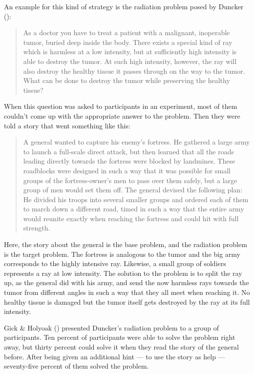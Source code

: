 \documentclass[
]{krantz}
\begin{document}
An example for this kind of strategy is the radiation problem posed by Duncker ():

\begin{quote}
As a doctor you have to treat a patient with a malignant, inoperable tumor, buried deep inside the body. There exists a special kind of ray which is harmless at a low intensity, but at sufficiently high intensity is able to destroy the tumor. At such high intensity, however, the ray will also destroy the healthy tissue it passes through on the way to the tumor. What can be done to destroy the tumor while preserving the healthy tissue?
\end{quote}

When this question was asked to participants in an experiment, most of them couldn't come up with the appropriate answer to the problem. Then they were told a story that went something like this:

\begin{quote}
A general wanted to capture his enemy's fortress. He gathered a large army to launch a full-scale direct attack, but then learned that all the roads leading directly towards the fortress were blocked by landmines. These roadblocks were designed in such a way that it was possible for small groups of the fortress-owner's men to pass over them safely, but a large group of men would set them off. The general devised the following plan: He divided his troops into several smaller groups and ordered each of them to march down a different road, timed in such a way that the entire army would reunite exactly when reaching the fortress and could hit with full strength.
\end{quote}

Here, the story about the general is the base problem, and the radiation problem is the target problem. The fortress is analogous to the tumor and the big army corresponds to the highly intensive ray. Likewise, a small group of soldiers represents a ray at low intensity. The solution to the problem is to split the ray up, as the general did with his army, and send the now harmless rays towards the tumor from different angles in such a way that they all meet when reaching it. No healthy tissue is damaged but the tumor itself gets destroyed by the ray at its full intensity.

Gick \& Holyoak () presented Duncker's radiation problem to a group of participants. Ten percent of participants were able to solve the problem right away, but thirty percent could solve it when they read the story of the general before. After being given an additional hint --- to use the story as help --- seventy-five percent of them solved the problem.
\end{document}
